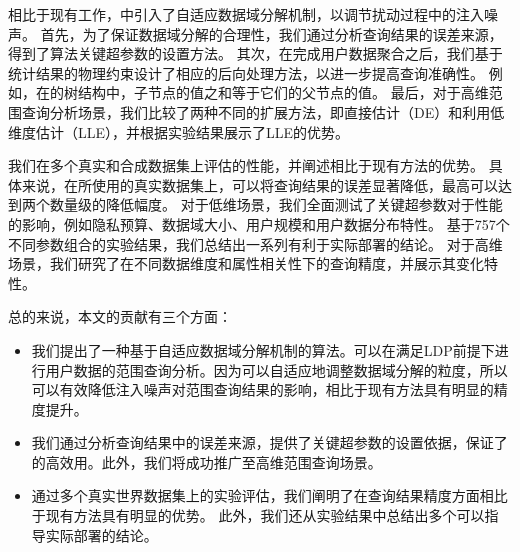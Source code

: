 相比于现有工作，\myahead 中引入了自适应数据域分解机制，以调节扰动过程中的注入噪声。
首先，为了保证数据域分解的合理性，我们通过分析\myahead 查询结果的误差来源，得到了算法关键超参数的设置方法。
其次，在\myahead 完成用户数据聚合之后，我们基于统计结果的物理约束设计了相应的后向处理方法，以进一步提高查询准确性。
例如，在\myahead 的树结构中，子节点的值之和等于它们的父节点的值。
最后，对于高维范围查询分析场景，我们比较了两种不同的扩展方法，即直接估计（DE）和利用低维度估计（LLE），并根据实验结果展示了LLE的优势。

我们在多个真实和合成数据集上评估\myahead 的性能，并阐述\myahead 相比于现有方法的优势。
具体来说，在所使用的真实数据集上，\myahead 可以将查询结果的误差显著降低，最高可以达到两个数量级的降低幅度。
对于低维场景，我们全面测试了关键超参数对于\myahead 性能的影响，例如隐私预算、数据域大小、用户规模和用户数据分布特性。
基于757个不同参数组合的实验结果，我们总结出一系列有利于\myahead 实际部署的结论。
对于高维场景，我们研究了\myahead 在不同数据维度和属性相关性下的查询精度，并展示其变化特性。

总的来说，本文的贡献有三个方面：
\begin{itemize}
    \item 我们提出了一种基于自适应数据域分解机制的算法。\myahead 可以在满足LDP前提下进行用户数据的范围查询分析。因为\myahead 可以自适应地调整数据域分解的粒度，所以\myahead 可以有效降低注入噪声对范围查询结果的影响，相比于现有方法具有明显的精度提升。
    \item 我们通过分析查询结果中的误差来源，提供了\myahead 关键超参数的设置依据，保证了\myahead 的高效用。此外，我们将\myahead 成功推广至高维范围查询场景。
    \item 通过多个真实世界数据集上的实验评估，我们阐明了\myahead 在查询结果精度方面相比于现有方法具有明显的优势。
    此外，我们还从实验结果中总结出多个可以指导\myahead 实际部署的结论。
\end{itemize}



